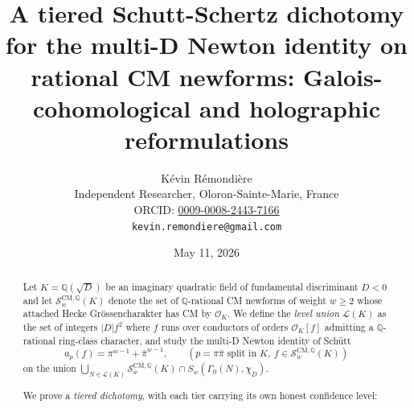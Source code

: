 \documentclass[11pt,a4paper]{amsart}
\title[A tiered Schutt-Schertz dichotomy: Galois-cohomological and holographic reformulations]{A tiered Schutt-Schertz dichotomy for the multi-D Newton identity on rational CM newforms: Galois-cohomological and holographic reformulations}
\author{K\'evin R\'emondi\`ere\\
\small Independent Researcher, Oloron-Sainte-Marie, France\\
\small ORCID: \href{https://orcid.org/0009-0008-2443-7166}{0009-0008-2443-7166}\\
\small \texttt{kevin.remondiere@gmail.com}}
\date{May 11, 2026}
\theoremstyle{definition}
\newcommand{\Q}{\mathbb{Q}}
\newcommand{\OK}{\mathcal{O}_K}
\newcommand{\Lcal}{\mathcal{L}}
\newcommand{\Scal}{\mathcal{S}}
\begin{document}
\begin{abstract}
Let $K = \Q(\sqrt{D})$ be an imaginary quadratic field of fundamental discriminant $D < 0$ and let $\Scal_w^{\mathrm{CM},\Q}(K)$ denote the set of $\Q$-rational CM newforms of weight $w \ge 2$ whose attached Hecke Gr\"ossencharakter has CM by $\OK$. We define the \emph{level union} $\Lcal(K)$ as the set of integers $|D| f^2$ where $f$ runs over conductors of orders $\OK[f]$ admitting a $\Q$-rational ring-class character, and study the multi-D Newton identity of Sch\"utt
\[
a_p(f) = \pi^{w-1} + \bar\pi^{w-1}, \qquad (p = \pi\bar\pi \text{ split in } K, \ f \in \Scal_w^{\mathrm{CM},\Q}(K))
\]
on the union $\bigcup_{N \in \Lcal(K)} \Scal_w^{\mathrm{CM},\Q}(K) \cap S_w(\Gamma_0(N), \chi_D)$.

We prove a \emph{tiered dichotomy}, with each tier carrying its own honest confidence level:


\end{abstract}
\end{document}
